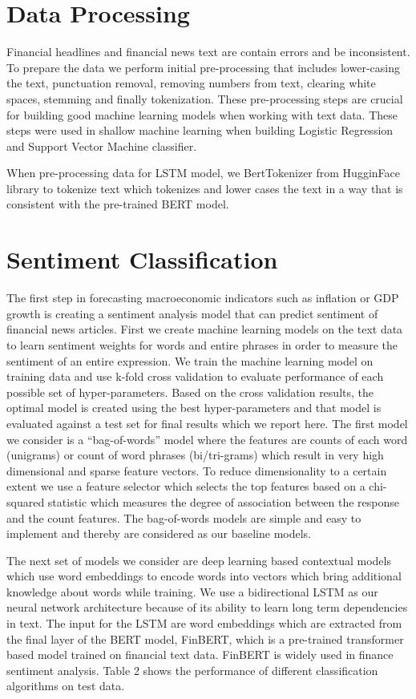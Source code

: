 \documentclass[11pt,a4paper]{article}
\begin{document}
\section{Data Processing}
Financial headlines and financial news text are contain errors and be inconsistent. To prepare the data we perform initial pre-processing that includes lower-casing the text, punctuation removal, removing numbers from text, clearing white spaces, stemming and finally tokenization. These pre-processing steps are crucial for building good machine learning models when working with text data. These steps were used in shallow machine learning when building Logistic Regression and Support Vector Machine classifier.

When pre-processing data for LSTM model, we BertTokenizer from HugginFace library to tokenize text which tokenizes and lower cases the text in a way that is consistent with the pre-trained BERT model.

\section{Sentiment Classification}

The first step in forecasting macroeconomic indicators such as inflation or GDP growth is creating a sentiment analysis model that can predict sentiment of financial news articles. First we create machine learning models on the text data to learn sentiment weights for words and entire phrases in order to measure the sentiment of an entire expression. We train the machine learning model on training data and use k-fold cross validation to evaluate performance of each possible set of hyper-parameters. Based on the cross validation results, the optimal model is created using the best hyper-parameters and that model is evaluated against a test set for final results which we report here.
The first model we consider is a “bag-of-words” model where the features are counts of each word (unigrams) or count of word phrases (bi/tri-grams) which result in very high dimensional and sparse feature vectors. To reduce dimensionality to a certain extent we use a feature selector which selects the top features based on a chi-squared statistic which measures the degree of association between the response and the count features. The bag-of-words models are simple and easy to implement and thereby are considered as our baseline models. 

The next set of models we consider are deep learning based contextual models which use word embeddings to encode words into vectors which bring additional knowledge about words while training. We use a bidirectional LSTM as our neural network architecture  because of its ability to learn long term dependencies in text. The input for the LSTM are word embeddings which are extracted from the final layer of the BERT model, FinBERT, which is a pre-trained transformer based model trained on financial text data. FinBERT is widely used in finance sentiment analysis. Table 2 shows the performance of different classification algorithms on test data.
\end{document}
